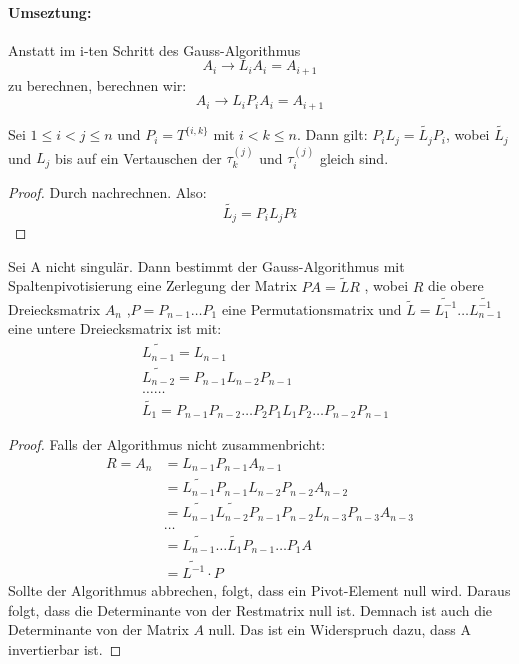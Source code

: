 \paragraph{Umseztung:} Anstatt im i-ten Schritt des Gauss-Algorithmus 
\[
A_i \to L_iA_i =A_{i+1}
\]
zu berechnen, berechnen wir:
\begin{equation}
\label{eqn:lr-gauss}
A_i \to  L_iP_iA_i = A_{i+1}
\end{equation}
\begin{lemma}
	Sei $1 \le i < j \le n$ und $P_i = T^{\{i,k\} }$ mit $i<k\le n$. Dann gilt: $P_iL_j=\tilde{L_j}P_i$, wobei $\tilde{L_j}$ und $L_j$ bis auf ein Vertauschen der $\tau_k^{(j)}$ und $\tau_i^{(j)}$ gleich sind.  
\end{lemma}
\begin{proof}
Durch nachrechnen. Also:
\[
\tilde{L_j} = P_iL_jPi
\]
\end{proof}
\begin{theorem}
	Sei A nicht singulär. Dann bestimmt der Gauss-Algorithmus mit Spaltenpivotisierung eine Zerlegung der Matrix $PA=\tilde{L}R$ , wobei $R$ die obere Dreiecksmatrix $A_n$ ,$P=P_{n-1} \ldots P_1$ eine Permutationsmatrix und $\tilde{L} = \tilde{L_1^{-1}}\ldots\tilde{L_{n-1}^{-1}}$ eine untere Dreiecksmatrix ist mit:
	\begin{align*}
		&\tilde{L_{n-1}} = L_{n-1} \\
		&\tilde{L_{n-2}} = P_{n-1} L_{n-2} P_{n-1} \\
		&\ldots  \ldots\\
		&\tilde{L_1}= P_{n-1}P_{n-2}\ldots P_2P_1 L_1 P_2 \ldots P_{n-2} P_{n-1}
	\end{align*}
\end{theorem}
\begin{proof}
Falls der Algorithmus nicht zusammenbricht:
\begin{align*}
	R = A_n &= L_{n-1} P_{n-1} A_{n-1} \\
		&= \tilde{L_{n-1}} P_{n-1} L_{n-2} P_{n-2} A_{n-2} \\
		&= \tilde{L_{n-1}}\tilde{L_{n-2}} P_{n-1} P_{n-2} L_{n-3} P_{n-3} A_{n-3} \\
		&\ldots \\
		&= \tilde{L_{n-1}}\ldots \tilde{L_1} P_{n-1}\ldots P_1 A \\
		&= \tilde{L^{-1}} \cdot P
\end{align*}
Sollte der Algorithmus abbrechen, folgt, dass ein Pivot-Element null wird. Daraus folgt, dass die Determinante von der Restmatrix null ist. Demnach ist auch die Determinante von der Matrix $A$ null. Das ist ein Widerspruch dazu, dass A invertierbar ist. 
\end{proof}
